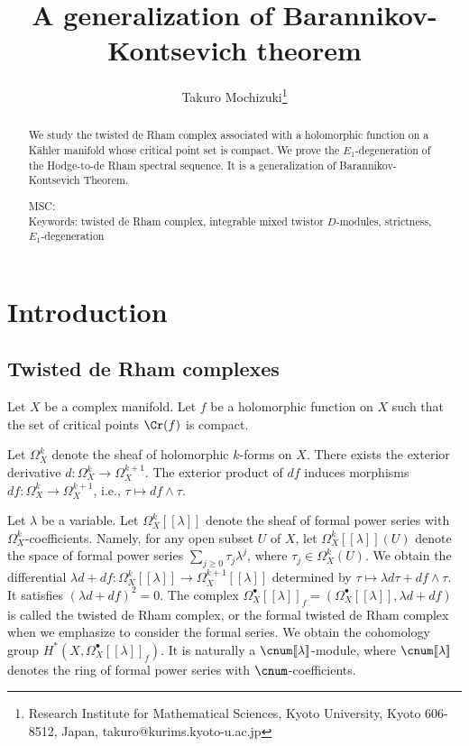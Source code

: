 \documentclass[a4,10pt]{article}
\begin{document}
\title{A generalization of Barannikov-Kontsevich theorem}

\author{Takuro Mochizuki\thanks{Research Institute for Mathematical Sciences, Kyoto University, Kyoto 606-8512, Japan, takuro@kurims.kyoto-u.ac.jp}}
\date{}
\maketitle

\begin{abstract}
We study the twisted de Rham complex associated with
a holomorphic function on a K\"ahler manifold
whose critical point set is compact.
We prove
the $E_1$-degeneration of
the Hodge-to-de Rham spectral sequence.
It is a generalization of Barannikov-Kontsevich Theorem. 

\vspace{.1in}
\noindent
MSC: 
\\
Keywords:
twisted de Rham complex,
integrable mixed twistor $D$-modules,
strictness,
$E_1$-degeneration
\end{abstract}

\section{Introduction}

\subsection{Twisted de Rham complexes}

Let $X$ be a complex manifold.
Let $f$ be a holomorphic function on $X$
such that the set of critical points $\Cr(f)$ is compact.

Let $\Omega _X^k$ denote the sheaf of
holomorphic $k$-forms on $X$.
There exists the exterior derivative
$d:\Omega^{k}_X\to \Omega^{k+1}_X$.
The exterior product of $df$ induces morphisms
$df:\Omega^k_X\to \Omega^{k+1}_X$,
i.e.,
$\tau\longmapsto df\wedge\tau$.

Let $\lambda$ be a variable.
Let $\Omega_X^k[\![\lambda]\!]$
denote the sheaf of formal power series
with $\Omega_X^k$-coefficients.
Namely,
for any open subset $U$ of $X$,
let $\Omega_X^k[\![\lambda]\!](U)$
denote the space of 
formal power series
$\sum_{j\geq 0} \tau_j\lambda^j$,
where $\tau_j\in\Omega_X^k(U)$.
We obtain the differential
$\lambda d+df:
\Omega_X^{k}[\![\lambda]\!]
\to
\Omega_X^{k+1}[\![\lambda]\!]$
determined by
$\tau\mapsto \lambda d\tau+df\wedge \tau$.
It satisfies $(\lambda d+df)^2=0$.
The complex
$\Omega_X^{\bullet}[\![\lambda]\!]_f=
(\Omega_X^{\bullet}[\![\lambda]\!],\lambda d+df)$
is called the twisted de Rham complex,
or the formal twisted de Rham complex
when we emphasize to consider the formal series.
We obtain the cohomology group
$H^{\ast}(X,\Omega^{\bullet}_X[\![\lambda]\!]_f)$.
It is naturally a $\cnum[\![\lambda]\!]$-module,
where $\cnum[\![\lambda]\!]$ denotes the ring of formal power
series with $\cnum$-coefficients.
\end{document}
